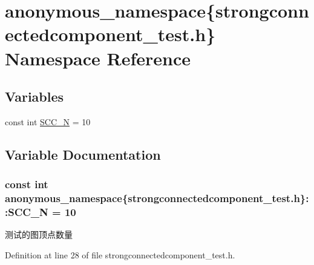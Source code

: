 \hypertarget{namespaceanonymous__namespace_02strongconnectedcomponent__test_8h_03}{}\section{anonymous\+\_\+namespace\{strongconnectedcomponent\+\_\+test.\+h\} Namespace Reference}
\label{namespaceanonymous__namespace_02strongconnectedcomponent__test_8h_03}
\subsection*{Variables}
\begin{DoxyCompactItemize}
\item 
const int \hyperlink{namespaceanonymous__namespace_02strongconnectedcomponent__test_8h_03_a16ade4f6cba9de3ca5ace5a83ba72457}{S\+C\+C\+\_\+\+N} = 10
\end{DoxyCompactItemize}


\subsection{Variable Documentation}
\hypertarget{namespaceanonymous__namespace_02strongconnectedcomponent__test_8h_03_a16ade4f6cba9de3ca5ace5a83ba72457}{}
\subsubsection[{S\+C\+C\+\_\+\+N}]{\setlength{\rightskip}{0pt plus 5cm}const int anonymous\+\_\+namespace\{strongconnectedcomponent\+\_\+test.\+h\}\+::S\+C\+C\+\_\+\+N = 10}\label{namespaceanonymous__namespace_02strongconnectedcomponent__test_8h_03_a16ade4f6cba9de3ca5ace5a83ba72457}
测试的图顶点数量 

Definition at line 28 of file strongconnectedcomponent\+\_\+test.\+h.

